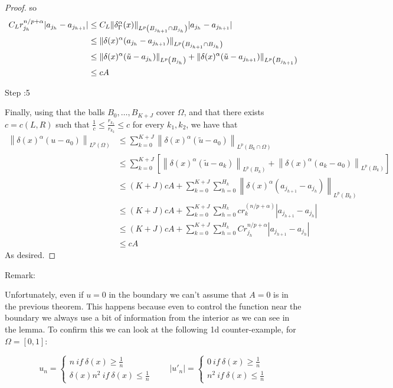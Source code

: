 \begin{proof}
so
\begin{align*}
    C_Lr_{j_h}^{n / p+\alpha}|a_{j_{h}}-a_{j_{h+1}}| &\leq
    C_L  \|\delta_\Gamma^\alpha(x)\|_{L^p \left(B_{j_{h+1}} \cap B_{j_{h}}\right)}|a_{j_{h}}-a_{j_{h+1}}|\\
    &\leq \|\delta(x)^\alpha(a_{j_{h}}-a_{j_{h+1}})\|_{L^p \left(B_{j_{h+1}} \cap B_{j_{h}}\right)}\\
    &\leq  \|\delta(x)^\alpha(\tilde{u}-a_{j_{h}})\|_{L^p \left(  B_{j_{h}}\right)}+ \|\delta(x)^\alpha(\tilde{u}-a_{j_{h+1}})\|_{L^p \left(B_{j_{h+1}}\right)}\\
    & \leq cA
\end{align*}

Step :5

Finally, using that the balls $B_0, \ldots, B_{K+J}$ cover $\Omega$, and that there exists $c=c(L,R)$ such that $\frac{1}{c}\leq\frac{r_{k_1}}{r_{k_2}}\leq c$ for every $k_1,k_2$, we have that
\begin{align*}
\left\|\delta(x)^\alpha (u-a_0)\right\|_{L^p(\Omega)} &\leq \sum_{k=0}^{K+J}\left\|\delta(x)^\alpha (\tilde{u}-a_0)\right\|_{L^p(B_k\cap \Omega)}\\
&\leq\sum_{k=0}^{K+J}\left[\left\|\delta(x)^\alpha (\tilde{u}-a_k)\right\|_{L^p(B_k)}+\left\|\delta(x)^\alpha (a_k-a_0)\right\|_{L^p(B_k)}\right]\\
&\leq (K+J)c A +\sum_{k=0}^{K+J}\sum_{h=0}^{H_k} \left\|\delta(x)^\alpha (a_{j_{h+1}}-a_{j_h 
 }) \right\|_{L^p(B_k)}\\ 
 &\leq (K+J)c A+\sum_{k=0}^{K+J}\sum_{h=0}^{H_k}c r_k^{(n/p+\alpha)}\left|a_{j_{h+1}}-a_{j_h 
 }\right|\\
 &\leq (K+J)c A + \sum_{k=0}^{K+J}\sum_{h=0}^{H_k}C r_{j_h}^{n/p+\alpha}\left|a_{j_{h+1}}-a_{j_h 
 }\right| \\
 & \leq c A 
\end{align*}
As desired. 

\end{proof}

Remark:

Unfortunately, even if $u=0$ in the boundary we can't assume that $A=0$ is in the previous theorem. This happens because even to control the function near the boundary we always use a bit of information from the interior as we can see in the lemma. To confirm this we can look at the following 1d counter-example, for $\Omega =[0,1]$:

$$u_n=\begin{cases} n\ if\  \delta(x)\geq \frac{1}{n}\\
\delta(x)n^{2}\  if \  \delta(x)\leq \frac{1}{n} \end{cases}\qquad |u'_n| = \begin{cases} 0\ if\  \delta(x)\geq \frac{1}{n}\\
n^{2}\  if \  \delta(x)\leq \frac{1}{n} \end{cases}
$$

